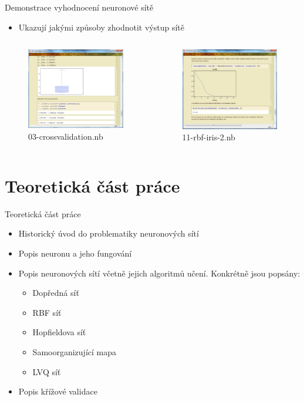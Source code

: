 \documentclass{beamer}
\begin{document}
\begin{frame}{Demonstrace vyhodnocení neuronové sítě}
\begin{itemize}
\item Ukazují jakými způsoby zhodnotit výstup sítě
\end{itemize} 
  \begin{columns}[T]
    \column{5cm}
      \begin{figure}
   \includegraphics[width=5.5cm]{uk5.png}
   \caption{03-crossvalidation.nb}
\end{figure}
    \column{5cm}
      \begin{figure}
   \includegraphics[width=5.5cm]{uk6.png}
   \caption{11-rbf-iris-2.nb}
\end{figure}
  \end{columns}
\end{frame}

\section{Teoretická část práce}
\begin{frame}{Teoretická část práce}
\begin{itemize}
\item Historický úvod do problematiky neuronových sítí
\item Popis neuronu a jeho fungování
\item Popis neuronových sítí včetně jejich algoritmů učení. Konkrétně jsou popsány:
\begin{itemize}
\item Dopředná síť
\item RBF síť
\item Hopfieldova síť
\item Samoorganizující mapa
\item LVQ síť
\end{itemize}
\item Popis křížové validace
\end{itemize}
\end{frame}
\end{document}
